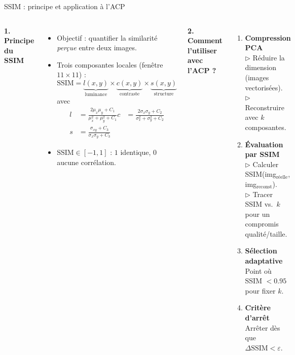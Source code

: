 \documentclass{beamer}
\begin{document}
\begin{frame}[t]{SSIM : principe et application à l’ACP}
\small
\begin{columns}[T,onlytextwidth]

\textbf{1. Principe du SSIM}\\[0.4em]
{
  \setlength{\itemsep}{0.15em}
  \begin{itemize}
    \item \alert{Objectif :} quantifier la similarité \emph{perçue} entre deux images.
    \item Trois composantes locales (fenêtre $11\times11$) :
      \[
        \text{SSIM}=
          \underbrace{l(x,y)}_{\text{luminance}}\times
          \underbrace{c(x,y)}_{\text{contraste}}\times
          \underbrace{s(x,y)}_{\text{structure}}
      \]
      avec
      \[\begin{aligned}
        l&=\frac{2\mu_x\mu_y+C_1}{\mu_x^2+\mu_y^2+C_1}
        c&=\frac{2\sigma_x\sigma_y+C_2}{\sigma_x^2+\sigma_y^2+C_2}\\
        s&=\frac{\sigma_{xy}+C_3}{\sigma_x\sigma_y+C_3}
      \end{aligned}\]
    \item $\text{SSIM}\in[-1,1]$ : $1$ identique, $0$ aucune corrélation.
  \end{itemize}
}

\textbf{2. Comment l’utiliser avec l’ACP ?}\\[0.4em]
{
  \setlength{\itemsep}{0.4em}
  \begin{enumerate}
    \item \textbf{Compression PCA}\\
          $\triangleright$ Réduire la dimension (images vectorisées).\\
          $\triangleright$ Reconstruire avec $k$ composantes.
    \item \textbf{Évaluation par SSIM}\\
          $\triangleright$ Calculer SSIM(img$_\text{réelle}$, img$_\text{reconst}$).\\
          $\triangleright$ Tracer SSIM vs.\ $k$ pour un compromis qualité/taille.
    \item \textbf{Sélection adaptative}\\
          Point où SSIM $<0.95$ pour fixer $k$.
    \item \textbf{Critère d’arrêt}\\
          Arrêter dès que $\Delta\text{SSIM} < \varepsilon$.
  \end{enumerate}
}

\end{columns}
\end{frame}
\end{document}
